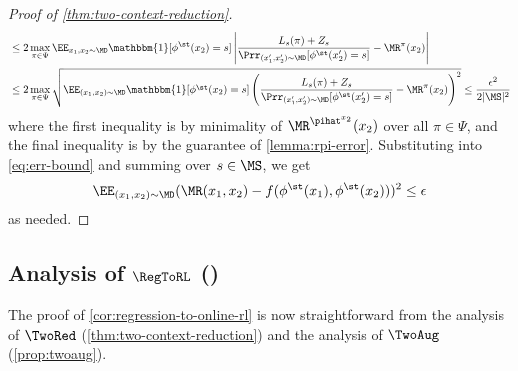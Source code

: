 \begin{proof}[Proof of \cref{thm:two-context-reduction}]
\begin{align*}
&\leq 2\max_{\pi\in\Psi} \EE_{x_1,x_2 \sim \MD} \mathbbm{1}[\phi^\st(x_2)=s] \left| \frac{L_s(\pi) + Z_s}{\Prr_{(x_1',x_2')\sim\MD}[\phi^\st(x_2')=s]} - \MR^\pi(x_2)\right| \\ 
&\leq 2\max_{\pi\in\Psi} \sqrt{\EE_{(x_1,x_2) \sim \MD} \mathbbm{1}[\phi^\st(x_2)=s] \left( \frac{L_s(\pi) + Z_s}{\Prr_{(x_1',x_2')\sim\MD}[\phi^\st(x_2')=s]} - \MR^\pi(x_2)\right)^2}
\leq \frac{\epsilon^2}{2|\MS|^2}
\end{align*}
where the first inequality is by minimality of $\MR^{\pihat^{x_2}}(x_2)$ over all $\pi \in \Psi$, and the final inequality is by the guarantee of \cref{lemma:rpi-error}. %
Substituting into \cref{eq:err-bound} and summing over $s \in \MS$, we get 
\[\EE_{(x_1,x_2)\sim\MD} (\MR(x_1,x_2) - f(\phi^\st(x_1),\phi^\st(x_2)))^2 \leq \epsilon\]
as needed.
\end{proof}

\subsection{Analysis of $\RegToRL$ ()}\label{sec:regtorl}

The proof of \cref{cor:regression-to-online-rl} is now straightforward from the analysis of $\TwoRed$ (\cref{thm:two-context-reduction}) and the analysis of $\TwoAug$ (\cref{prop:twoaug}).

\vspace{1em}

